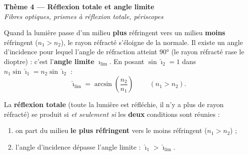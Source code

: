 \documentclass[11pt,a4paper]{article}
\begin{document}

\begin{center}
{\LARGE\bfseries\color{primarydark} Thème 4 — Réflexion totale et angle limite}\\[2pt]
{\color{primary}\itshape Fibres optiques, prismes à réflexion totale, périscopes}
\end{center}

\begin{cle}
Quand la lumière passe d'un milieu \textbf{plus} réfringent vers un milieu \textbf{moins} réfringent
($n_1>n_2$), le rayon réfracté s'éloigne de la normale. Il existe un angle d'incidence pour lequel
l'angle de réfraction atteint $\ang{90}$ (le rayon réfracté rase le dioptre) : c'est l'\textbf{angle
limite} $\hat{\imath}_{\text{lim}}$. En posant $\sin\hat{\imath}_2=1$ dans $n_1\sin\hat{\imath}_1=n_2\sin\hat{\imath}_2$ :
\[ \boxed{\;\hat{\imath}_{\text{lim}}=\arcsin\!\left(\dfrac{n_2}{n_1}\right)\;}\qquad(n_1>n_2). \]
\end{cle}

\begin{cle}
La \textbf{réflexion totale} (toute la lumière est réfléchie, il n'y a plus de rayon réfracté) se
produit si \emph{et seulement si} les \textbf{deux} conditions sont réunies :
\begin{enumerate}[label=(\arabic*),leftmargin=2em,topsep=2pt,itemsep=1pt]
  \item on part du milieu \textbf{le plus réfringent} vers le moins réfringent ($n_1>n_2$) ;
  \item l'angle d'incidence dépasse l'angle limite : $\hat{\imath}_1>\hat{\imath}_{\text{lim}}$.
\end{enumerate}
\end{cle}
\end{document}
